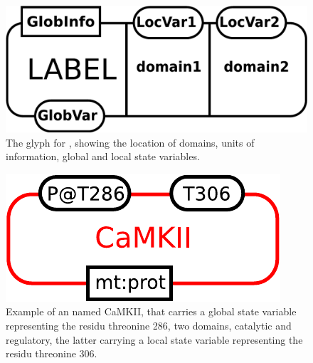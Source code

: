 \begin{figure}[H]
  \centering
  \includegraphics[scale = 0.3]{images/entity}
  \caption{The \ER glyph for , showing the location of domains, units of information, global and local state variables.}
  \label{fig:entity}
\end{figure}

\begin{figure}[H]
  \centering
  \includegraphics[scale = 0.5]{examples/ex-entity}
  \caption{Example of an  named CaMKII, that carries a global state variable representing the residu threonine 286, two domains, catalytic and regulatory, the latter carrying a local state variable representing the residu threonine 306.}
  \label{fig:ex-entity}
\end{figure}

\normalcolor
